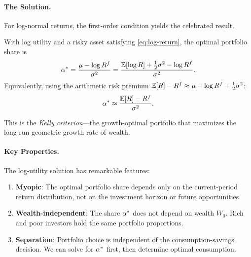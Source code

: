 \paragraph{The Solution.}

For log-normal returns, the first-order condition yields the celebrated result.

\begin{proposition}
\label{prop:log-portfolio}
With log utility and a risky asset satisfying \eqref{eq:log-return}, the optimal portfolio share is
\begin{equation}
\alpha^{*} = \frac{\mu - \log R^f}{\sigma^2} = \frac{\mathbb{E}[\log R] + \frac{1}{2}\sigma^2 - \log R^f}{\sigma^2}.
\label{eq:log-portfolio}
\end{equation}
Equivalently, using the arithmetic risk premium $\mathbb{E}[R] - R^f \approx \mu - \log R^f + \frac{1}{2}\sigma^2$:
\begin{equation}
\alpha^{*} \approx \frac{\mathbb{E}[R] - R^f}{\sigma^2}.
\label{eq:log-portfolio-approx}
\end{equation}
\end{proposition}

This is the \emph{Kelly criterion}---the growth-optimal portfolio that maximizes the long-run geometric growth rate of wealth.

\paragraph{Key Properties.}

The log-utility solution has remarkable features:

\begin{enumerate}[label=(\roman*)]
    \item \textbf{Myopic}: The optimal portfolio share depends only on the current-period return distribution, not on the investment horizon or future opportunities.
    
    \item \textbf{Wealth-independent}: The share $\alpha^{*}$ does not depend on wealth $W_0$. Rich and poor investors hold the same portfolio proportions.
    
    \item \textbf{Separation}: Portfolio choice is independent of the consumption-savings decision. We can solve for $\alpha^{*}$ first, then determine optimal consumption.
\end{enumerate}

